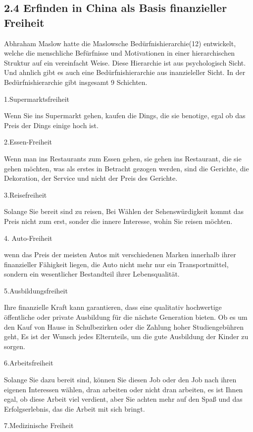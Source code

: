 \documentclass[11pt,a4paper]{article}
\begin{document}
\subsection{2.4 Erfinden in China als Basis finanzieller Freiheit}

Abhraham Maslow hatte die Maslowsche Bedürfnishierarchie(12) entwickelt,
welche die menschliche Befürfnisse und Motivationen  in einer hierarchischen
Struktur auf ein vereinfacht Weise. Diese Hierarchie ist aus psychologisch
Sicht. Und ahnlich gibt es auch eine Bedürfnishierarchie aus inanzieleller
Sicht. In der Bedürfnishierarchie gibt insgesamt 9 Schichten.

1.Supermarktsfreiheit

Wenn Sie ins Supermarkt gehen, kaufen die Dings, die sie benotige, egal ob das
Preis der Dings einige hoch ist.

2.Essen-Freiheit

Wenn man ins Restaurants zum Essen gehen, sie gehen ins  Restaurant, die  sie
gehen möchten, was als erstes in Betracht gezogen werden, sind die Gerichte,
die Dekoration, der Service und nicht der Preis des Gerichte.

3.Reisefreiheit

Solange Sie bereit sind zu reisen,  Bei Wählen der Sehenswürdigkeit  kommt
das Preis nicht zum erst, sonder die innere Interesse, wohin Sie reisen
möchten.

4. Auto-Freiheit

wenn das Preis der meisten Autos mit verschiedenen Marken innerhalb ihrer
finanzieller Fähigkeit liegen, die Auto nicht mehr nur ein Transportmittel,
sondern ein wesentlicher Bestandteil ihrer Lebensqualität.

5.Ausbildungsfreiheit

Ihre finanzielle Kraft kann garantieren, dass eine qualitativ hochwertige
öffentliche oder private Ausbildung für die nächste Generation bieten. Ob es
um den Kauf von Hause in Schulbezirken oder die Zahlung hoher Studiengebühren
geht, Es ist der Wunsch jedes Elternteils, um die gute Ausbildung der Kinder
zu sorgen.

6.Arbeitsfreiheit

Solange Sie dazu bereit sind, können Sie diesen Job oder den Job nach ihren
eigenen Interessen wählen, dran arbeiten oder nicht dran arbeiten, es ist
Ihnen egal, ob diese Arbeit viel verdient, aber Sie achten mehr auf den Spaß
und das Erfolgserlebnis, das die Arbeit mit sich bringt.

7.Medizinische Freiheit
\end{document}
